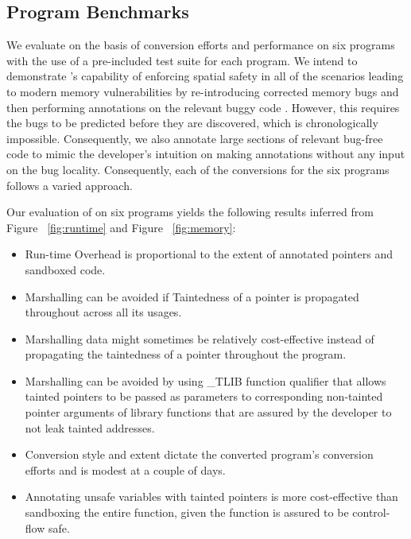 
\subsection{Program Benchmarks}
We evaluate \systemname on the basis of conversion efforts and performance on six programs with the use of a pre-included test suite for each program. We intend to demonstrate \systemname's capability of enforcing spatial safety in all of the scenarios leading to modern memory vulnerabilities by re-introducing corrected memory bugs and then performing \systemname annotations on the relevant buggy code . However, this requires the bugs to be predicted before they are discovered, which is chronologically impossible. Consequently, we also annotate large sections of relevant bug-free code to mimic the developer's intuition on making \systemname annotations without any input on the bug locality. Consequently, each of the conversions for the six programs follows a varied approach. 

Our evaluation of \systemname on six programs yields the following results inferred from Figure ~\ref{fig:runtime} and Figure ~\ref{fig:memory}:
\begin{itemize}
  \item Run-time Overhead is proportional to the extent of 
annotated pointers and sandboxed code.
  \item Marshalling can be avoided if Taintedness of a pointer is propagated throughout across all its usages.
  \item Marshalling data might sometimes be relatively cost-effective instead of propagating the taintedness of a pointer throughout the program.
  \item Marshalling can be avoided by using \_TLIB function qualifier that allows tainted pointers to be passed as parameters to corresponding non-tainted pointer arguments of library functions that are assured by the developer to not leak tainted addresses.
  \item Conversion style and extent dictate the converted program's conversion efforts and is modest at a couple of days. 
  \item Annotating unsafe variables with tainted pointers is more cost-effective than sandboxing the entire function, given the function is assured to be control-flow safe.  
\end{itemize}

